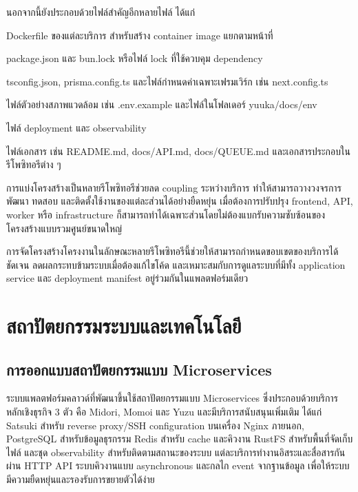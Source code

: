 \hspace*{1.3em}
นอกจากนี้ยังประกอบด้วยไฟล์สำคัญอีกหลายไฟล์ ได้แก่
\begin{mycustomitem}
    \item Dockerfile ของแต่ละบริการ สำหรับสร้าง container image แยกตามหน้าที่
    \item package.json และ bun.lock หรือไฟล์ lock ที่ใช้ควบคุม dependency
    \item tsconfig.json, prisma.config.ts และไฟล์กำหนดค่าเฉพาะเฟรมเวิร์ก เช่น next.config.ts
    \item ไฟล์ตัวอย่างสภาพแวดล้อม เช่น .env.example และไฟล์ในโฟลเดอร์ yuuka/docs/env
    \item ไฟล์ deployment และ observability
    \item ไฟล์เอกสาร เช่น README.md, docs/API.md, docs/QUEUE.md และเอกสารประกอบในรีโพซิทอรีต่าง ๆ
\end{mycustomitem}
\hspace*{1.3em}
การแบ่งโครงสร้างเป็นหลายรีโพซิทอรีช่วยลด coupling ระหว่างบริการ ทำให้สามารถวางวงจรการพัฒนา ทดสอบ และติดตั้งใช้งานของแต่ละส่วนได้อย่างยืดหยุ่น เมื่อต้องการปรับปรุง frontend, API, worker หรือ infrastructure ก็สามารถทำได้เฉพาะส่วนโดยไม่ต้องแบกรับความซับซ้อนของโครงสร้างแบบรวมศูนย์ขนาดใหญ่


\hspace*{1.3em}
การจัดโครงสร้างโครงงานในลักษณะหลายรีโพซิทอรีนี้ช่วยให้สามารถกำหนดขอบเขตของบริการได้ชัดเจน ลดผลกระทบข้ามระบบเมื่อต้องแก้ไขโค้ด และเหมาะสมกับการดูแลระบบที่มีทั้ง application service และ deployment manifest อยู่ร่วมกันในแพลตฟอร์มเดียว

\section{สถาปัตยกรรมระบบและเทคโนโลยี}
\subsection{การออกแบบสถาปัตยกรรมแบบ Microservices}
\hspace*{1.3em}
ระบบแพลตฟอร์มคลาวด์ที่พัฒนาขึ้นใช้สถาปัตยกรรมแบบ Microservices ซึ่งประกอบด้วยบริการหลักเชิงธุรกิจ 3 ตัว คือ Midori, Momoi และ Yuzu และมีบริการสนับสนุนเพิ่มเติม ได้แก่ Satsuki สำหรับ reverse proxy/SSH configuration บนเครื่อง Nginx ภายนอก, PostgreSQL สำหรับข้อมูลธุรกรรม Redis สำหรับ cache และคิวงาน RustFS สำหรับพื้นที่จัดเก็บไฟล์ และชุด observability สำหรับติดตามสถานะของระบบ แต่ละบริการทำงานอิสระและสื่อสารกันผ่าน HTTP API ระบบคิวงานแบบ asynchronous และกลไก event จากฐานข้อมูล เพื่อให้ระบบมีความยืดหยุ่นและรองรับการขยายตัวได้ง่าย

